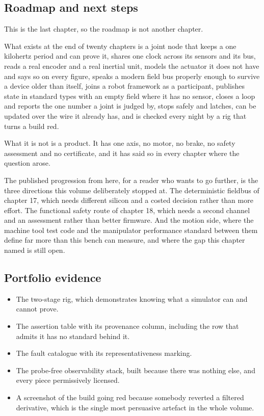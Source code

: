\subsection*{Roadmap and next steps}

This is the last chapter, so the roadmap is not another chapter.

What exists at the end of twenty chapters is a joint node that keeps a one
kilohertz period and can prove it, shares one clock across its sensors and its
bus, reads a real encoder and a real inertial unit, models the actuator it does
not have and says so on every figure, speaks a modern field bus properly enough
to survive a device older than itself, joins a robot framework as a participant,
publishes state in standard types with an empty field where it has no sensor,
closes a loop and reports the one number a joint is judged by, stops safely and
latches, can be updated over the wire it already has, and is checked every night
by a rig that turns a build red.

What it is not is a product. It has one axis, no motor, no brake, no safety
assessment and no certificate, and it has said so in every chapter where the
question arose.

The published progression from here, for a reader who wants to go further, is
the three directions this volume deliberately stopped at. The deterministic
fieldbus of chapter 17, which needs different silicon and a costed decision
rather than more effort. The functional safety route of chapter 18, which needs
a second channel and an assessment rather than better firmware. And the motion
side, where the machine tool test code and the manipulator performance standard
between them define far more than this bench can measure, and where the gap this
chapter named is still open.

\subsection*{Portfolio evidence}

\begin{itemize}
\item The two-stage rig, which demonstrates knowing what a simulator can and
cannot prove.
\item The assertion table with its provenance column, including the row that
admits it has no standard behind it.
\item The fault catalogue with its representativeness marking.
\item The probe-free observability stack, built because there was nothing else,
and every piece permissively licensed.
\item A screenshot of the build going red because somebody reverted a filtered
derivative, which is the single most persuasive artefact in the whole volume.
\end{itemize}

